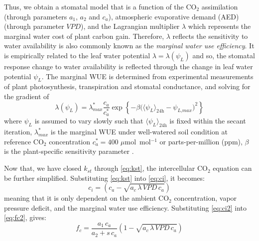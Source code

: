 Thus, we obtain a stomatal model that is a function of the CO$_2$ assimilation (through parameters $a_1$, $a_2$ and $c_a$), atmospheric evaporative demand (AED) (through parameter $\textit{VPD}$), and the Lagrangian multiplier $\lambda$ which represents the marginal water cost of plant carbon gain. Therefore, $\lambda$ reflects the sensitivity to water availability is also commonly known as the \textit{marginal water use efficiency}. It is empirically related to the leaf water potential $\lambda = \lambda(\psi_L)$ \citep{Manoli2014,Katul2010} and so, the stomatal response change to water availability is reflected through the change in leaf water potential $\psi_L$. The marginal WUE is determined from experimental measurements of plant photosynthesis, transpiration and stomatal conductance, and solving for the gradient of 
\begin{equation}
\lambda \left(\psi_L\right) = \lambda_{\textit{max}}^* \frac{c_a}{c_a^*}\exp \left\{-\beta \Big( \langle \psi_L \rangle_{\textit{24h}} - \psi_{\textit{L,max}}\Big)^2\right\}
\label{eq:mwue}
\end{equation}
where $\psi_L$ is assumed to vary slowly such that $\langle \psi_L \rangle_{\textit{24h}}$ is fixed within the secant iteration, $\lambda_{max}^*$ is the marginal WUE under well-watered soil condition at reference CO$_2$ concentration $c_a^*=400$ $\mu$mol~mol$^{-1}$ or parts-per-million (ppm), $\beta$ is the plant-specific sensitivity parameter \citep{Huang2017}.

Now that, we have closed $k_{\textit{st}}$ through \cref{eq:kst}, the intercellular CO$_2$ equation can be further simplified. Substituting \cref{eq:kst} into \cref{eq:ci}, it becomes:
\begin{equation}
c_i = \left(c_a - \sqrt{a_c\,\lambda\, \textit{VPD}\, c_a} \right)
\label{eq:ci2}
\end{equation}
meaning that it is only dependent on the ambient CO$_2$ concentration, vapor pressure deficit, and the marginal water use efficiency. Substituting \cref{eq:ci2} into \cref{eq:fc2}, gives:
\begin{equation}
f_c = \frac{a_1\,c_a}{a_2 + s\,c_a}\left(1-\sqrt{a_c\, \lambda\, \textit{VPD}\, c_a}\right)
\end{equation} 


